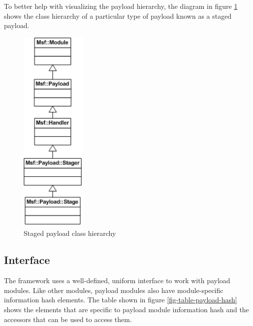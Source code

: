 \documentclass{report}
\begin{document}
\par
To better help with visualizing the payload hierarchy, the diagram
in figure \ref{fig-img-payload} shows the class hierarchy of a
particular type of payload known as a staged payload.

\begin{figure}[h]
\begin{center}
\includegraphics[height=4.0in]{dev_guide_payload_hierarchy}
\caption{Staged payload class hierarchy} \label{fig-img-payload}
\end{center}
\end{figure}

        \subsection{Interface}

\par
The framework uses a well-defined, uniform interface to work with
payload modules.  Like other modules, payload modules also have
module-specific information hash elements.  The table shown in
figure \ref{fig-table-payload-hash} shows the elements that are
specific to payload module information hash and the accessors that
can be used to access them.
\end{document}
